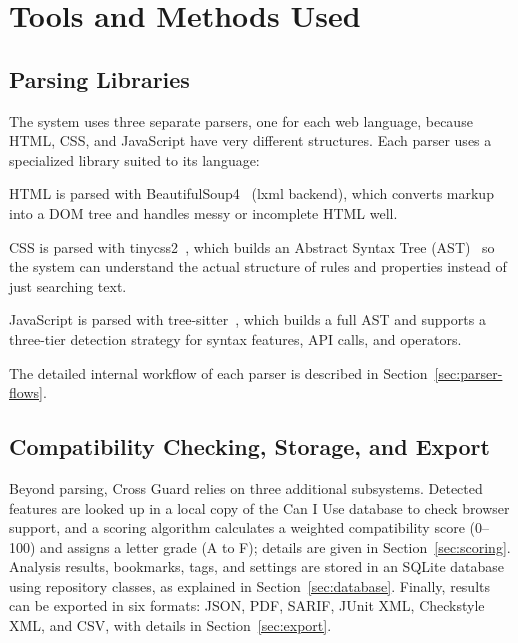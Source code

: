 \section{Tools and Methods Used}
\label{sec:tools-methods}

\subsection{Parsing Libraries}

The system uses three separate parsers, one for each web language, because HTML, CSS, and JavaScript have very different structures. Each parser uses a specialized library suited to its language:

\begin{compactitem}
    \item HTML is parsed with BeautifulSoup4~\cite{bs4docs} (lxml backend), which converts markup into a DOM tree and handles messy or incomplete HTML well.
    \item CSS is parsed with tinycss2~\cite{tinycss2}, which builds an Abstract Syntax Tree (AST)~\cite{aho2006compilers} so the system can understand the actual structure of rules and properties instead of just searching text.
    \item JavaScript is parsed with tree-sitter~\cite{treesitter}, which builds a full AST and supports a three-tier detection strategy for syntax features, API calls, and operators.
\end{compactitem}

The detailed internal workflow of each parser is described in Section~\ref{sec:parser-flows}.

\subsection{Compatibility Checking, Storage, and Export}

Beyond parsing, Cross Guard relies on three additional subsystems. Detected features are looked up in a local copy of the Can I Use database to check browser support, and a scoring algorithm calculates a weighted compatibility score (0--100) and assigns a letter grade (A to F); details are given in Section~\ref{sec:scoring}. Analysis results, bookmarks, tags, and settings are stored in an SQLite database using repository classes, as explained in Section~\ref{sec:database}. Finally, results can be exported in six formats: JSON, PDF, SARIF, JUnit XML, Checkstyle XML, and CSV, with details in Section~\ref{sec:export}.

